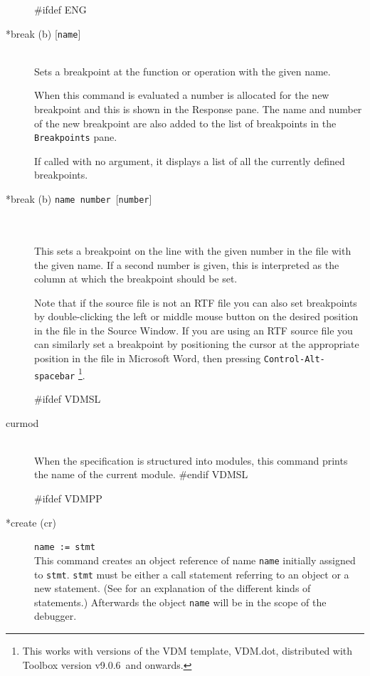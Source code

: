 \documentclass[\pformat,12pt]{article}
\newcommand{\vdmtoolsver}{v9.0.6}
\newcommand{\guicmd}[1]{{\sf #1}}
\newcommand{\guicmd}[1]{{\gt #1}}
\begin{document}
\begin{description}

#ifdef ENG
\item[*break (b) \mbox{[{\tt name}]}] 
\mbox{}\\
  Sets a breakpoint at the function or
  operation with the given name.

  When this command is evaluated a number is allocated for the new 
  breakpoint and this is shown in the \guicmd{Response} pane. The name
  and number of the new breakpoint are also added to the list of
  breakpoints in the \texttt{Breakpoints} pane.

  If called with no argument, it displays a list of all the currently 
  defined breakpoints.

\item[*break (b) \mbox{\texttt{name number} [\texttt{number}]}]\mbox{}\\
\mbox{}\\
 This sets a breakpoint on the line with the given number in the file
 with the given name. If a second number is given, this is 
 interpreted as the column at which the breakpoint should be set.

Note that if the source file is not an RTF file you can also set
breakpoints by double-clicking the left or middle mouse button on the
desired position in the file in the \guicmd{Source Window}. If you are
using an RTF source file you can similarly set a breakpoint by
positioning the cursor at the appropriate position in the file in
Microsoft Word, then pressing
\texttt{Control-Alt-spacebar}%
  \footnote{This works with versions of the VDM template,
  VDM.dot, 
  distributed with Toolbox version \vdmtoolsver\
  and onwards.}.

#ifdef VDMSL
\item[curmod] \mbox{}\\
  When the specification is structured into modules, this command
  prints the name of the current module.
#endif VDMSL

#ifdef VDMPP
\item[*create (cr)] {\tt name := stmt}\mbox{}\\
  This command creates an object reference of name {\tt name}
  initially assigned to {\tt stmt}.  {\tt stmt} must be either a
  call statement referring to an object or a new statement. (See
  \cite{LangManPP-CSK} for an explanation of the different kinds of
  statements.)  Afterwards the object {\tt name} will be in the scope
  of the debugger.
  

\end{description}
\end{document}
